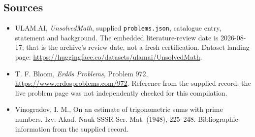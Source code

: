 \documentclass[11pt,a4paper]{article}
\begin{document}
\subsection{Sources}

{\small

\begin{itemize}

\item[\hypertarget{source:statement:1}{S1}] ULAM.AI, \emph{UnsolvedMath}, supplied \texttt{problems.json}, catalogue entry, statement and background. The embedded literature-review date is 2026-08-17; that is the archive’s review date, not a fresh certification. Dataset landing page: \url{https://huggingface.co/datasets/ulamai/UnsolvedMath}.

\item[\hypertarget{source:statement:2}{S2}] T. F. Bloom, \emph{Erdős Problems}, Problem 972, \url{https://www.erdosproblems.com/972}. Reference from the supplied record; the live problem page was not independently checked for this compilation.

\item[\hypertarget{source:statement:3}{S3}] Vinogradov, I. M., On an estimate of trigonometric sums with prime numbers. Izv. Akad. Nauk SSSR Ser. Mat. (1948), 225--248. Bibliographic information from the supplied record.

\end{itemize}

}

\label{end:statement}
\end{document}
